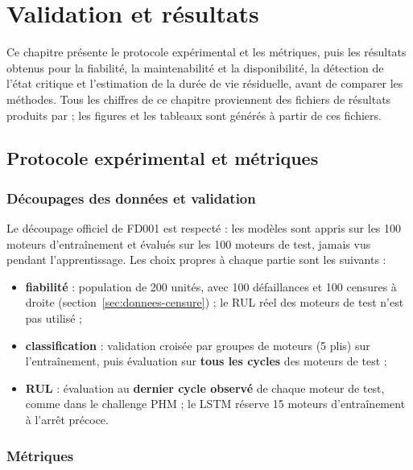\chapter{Validation et résultats}\label{sec:resultats}

\chapintro

Ce chapitre présente le protocole expérimental et les métriques, puis les résultats obtenus pour la fiabilité, la maintenabilité et la disponibilité, la détection de l'état critique et l'estimation de la durée de vie résiduelle, avant de comparer les méthodes. Tous les chiffres de ce chapitre proviennent des fichiers de résultats produits par  ; les figures et les tableaux sont générés à partir de ces fichiers.

\section{Protocole expérimental et métriques}\label{sec:protocole}

\subsection{Découpages des données et validation}\label{sec:decoupages}

Le découpage officiel de FD001 est respecté : les modèles sont appris sur les 100 moteurs d'entraînement et évalués sur les 100 moteurs de test, jamais vus pendant l'apprentissage. Les choix propres à chaque partie sont les suivants :

\begin{itemize}
\item \textbf{fiabilité} : population de 200 unités, avec 100 défaillances et 100 censures à droite (section~\ref{sec:donnees-censure}) ; le RUL réel des moteurs de test n'est pas utilisé ;
\item \textbf{classification} : validation croisée par groupes de moteurs (5 plis) sur l'entraînement, puis évaluation sur \textbf{tous les cycles} des moteurs de test ;
\item \textbf{RUL} : évaluation au \textbf{dernier cycle observé} de chaque moteur de test, comme dans le challenge PHM \cite{saxena2008damage} ; le LSTM réserve 15 moteurs d'entraînement à l'arrêt précoce.
\end{itemize}

\subsection{Métriques}\label{sec:metriques}

